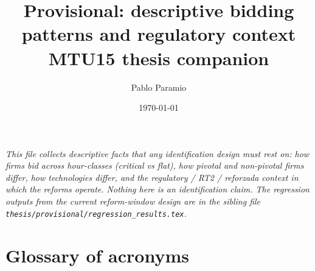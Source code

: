 \documentclass[11pt,a4paper]{article}
\title{Provisional: descriptive bidding patterns and regulatory context\\[3pt]\large MTU15 thesis companion}
\author{Pablo Paramio}
\date{\today}
\newcommand{\code}[1]{\nolinkurl{#1}}
\begin{document}
\maketitle

\noindent\emph{This file collects descriptive facts that any identification design must rest on: how firms bid across hour-classes (critical vs flat), how pivotal and non-pivotal firms differ, how technologies differ, and the regulatory / RT2 / reforzada context in which the reforms operate. Nothing here is an identification claim. The regression outputs from the current reform-window design are in the sibling file \code{thesis/provisional/regression_results.tex}.}

\tableofcontents

\clearpage

\section*{Glossary of acronyms}\label{sec:bid_internal:glossary}
\end{document}
